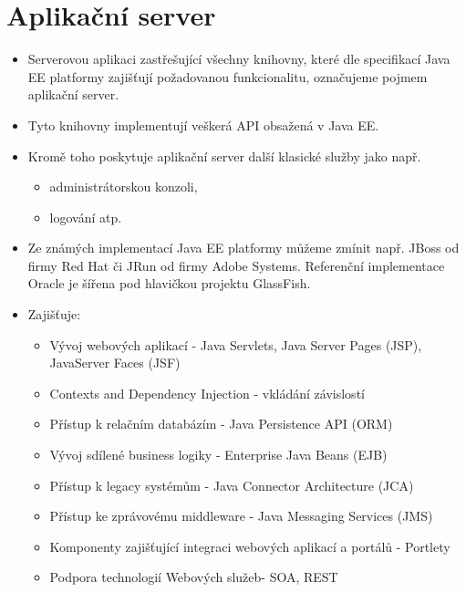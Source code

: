 \documentclass{szzclass}
\begin{document}
\section{Aplikační server}
\begin{itemize}
\item Serverovou aplikaci zastřešující všechny knihovny, které dle specifikací Java EE platformy zajišťují požadovanou funkcionalitu, označujeme pojmem aplikační server. 
\item Tyto knihovny implementují veškerá API obsažená v Java EE. 
\item Kromě toho poskytuje aplikační server další klasické služby jako např. 
  \begin{itemize}
    \item administrátorskou konzoli, 
    \item logování atp. 
  \end{itemize}
\item Ze známých implementací Java EE platformy můžeme zmínit např. JBoss od firmy Red Hat či JRun od firmy Adobe Systems. Referenční implementace Oracle je šířena pod hlavičkou projektu GlassFish.
\item Zajišťuje:
  \begin{itemize}
    \item Vývoj webových aplikací - Java Servlets, Java Server Pages (JSP), JavaServer Faces (JSF)
    \item Contexts and Dependency Injection - vkládání závislostí
    \item Přístup k relačním databázím - Java Persistence API (ORM)
    \item Vývoj sdílené business logiky - Enterprise Java Beans (EJB)
    \item Přístup k legacy systémům - Java Connector Architecture (JCA)
    \item Přístup ke zprávovému middleware - Java Messaging Services (JMS)
    \item Komponenty zajišťující integraci webových aplikací a portálů - Portlety
    \item Podpora technologií Webových služeb- SOA, REST
  \end{itemize}
\end{itemize}
\end{document}

